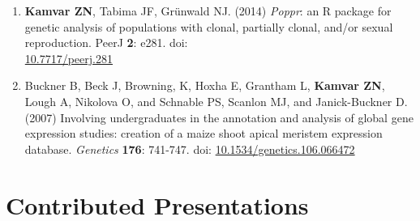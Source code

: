 \begin{enumerate}[leftmargin = 14pt]
	\vspace{3pt}

    \item \textbf{Kamvar ZN}, Tabima JF, Gr\"unwald NJ. (2014) \textit{Poppr}: an
	R package for genetic analysis of populations with clonal, partially clonal,
	and/or sexual reproduction. PeerJ \textbf{2}: e281. doi: \\
	\href{http://doi.org/10.7717/peerj.281}{10.7717/peerj.281}

	\vspace{3pt}

	\item Buckner B, Beck J, Browning, K, Hoxha E, Grantham L, \textbf{Kamvar
	ZN}, Lough A, Nikolova O, and Schnable PS, Scanlon MJ, and Janick-Buckner D.
	(2007) Involving undergraduates in the annotation and analysis of global
	gene expression studies: creation of a maize shoot apical meristem
	expression database. \textit{Genetics}
	\textbf{176}: 741-747. doi:
	\href{http://doi.org/10.1534/genetics.106.066472}{10.1534/genetics.106.066472}

\end{enumerate}



\section{Contributed Presentations}


